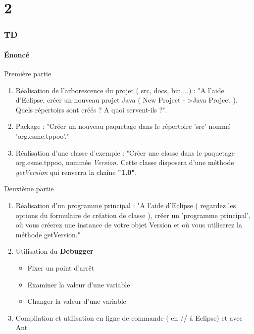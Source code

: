 \documentclass[handout]{beamer}
\begin{document}
\part{2}
\section{TD}
\subsection{{\'E}noncé}
\begin{frame}
	\begin{block}{Première partie}
		\begin{enumerate}
			\item  Réalisation de l'arborescence du projet ( src, docs, bin,...) : "A l'aide d'Eclipse, créer un nouveau projet Java ( New Project - \textgreater Java Project ). Quels répertoirs sont créés ? A quoi servent-ils ?".
			\item  Package : "Créer un nouveau paquetage dans le répertoire 'src' nommé  'org.esme.tppoo'."
			\item  Réalisation d'une classe d'exemple : "Créer une classe dans le paquetage org.esme.tppoo, nommée \textit{Version}. Cette classe disposera d'une méthode \textit{getVersion} qui renverra la chaîne \textbf{"1.0"}.
		\end{enumerate}
	\end{block}
\end{frame}
\begin{frame}
	\begin{block}{Deuxième partie}
		\begin{enumerate}
		\item  Réalisation d'un programme principal : "A l'aide d'Eclipse ( regardez les options du formulaire de création de classe ), créer un 'programme principal', où vous créerez une instance de votre objet Version et où vous utiliserez la méthode getVersion."
		\item  Utilisation du \textbf{Debugger}
			\begin{itemize}
				\item 	Fixer un point d'arrêt
				\item 	Examiner la valeur d'une variable
				\item	Changer la valeur d'une variable
			\end{itemize}
		\item Compilation et utilisation en ligne de commande ( en // à Eclipse) et avec Ant
		\end{enumerate}
	\end{block}
\end{frame}
\end{document}
